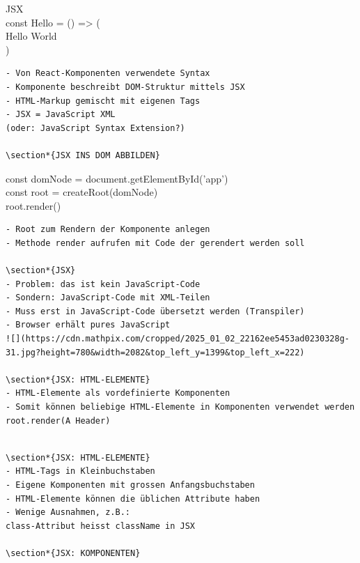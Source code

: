 JSX\\
const Hello = () => (\\
Hello World\\
)

\begin{verbatim}
- Von React-Komponenten verwendete Syntax
- Komponente beschreibt DOM-Struktur mittels JSX
- HTML-Markup gemischt mit eigenen Tags
- JSX = JavaScript XML
(oder: JavaScript Syntax Extension?)

\section*{JSX INS DOM ABBILDEN}
\end{verbatim}

const domNode = document.getElementById('app')\\
const root = createRoot(domNode)\\
root.render()

\begin{verbatim}
- Root zum Rendern der Komponente anlegen
- Methode render aufrufen mit Code der gerendert werden soll

\section*{JSX}
- Problem: das ist kein JavaScript-Code
- Sondern: JavaScript-Code mit XML-Teilen
- Muss erst in JavaScript-Code übersetzt werden (Transpiler)
- Browser erhält pures JavaScript
![](https://cdn.mathpix.com/cropped/2025_01_02_22162ee5453ad0230328g-31.jpg?height=780&width=2082&top_left_y=1399&top_left_x=222)

\section*{JSX: HTML-ELEMENTE}
- HTML-Elemente als vordefinierte Komponenten
- Somit können beliebige HTML-Elemente in Komponenten verwendet werden
root.render(A Header)
\end{verbatim}



\begin{verbatim}

\section*{JSX: HTML-ELEMENTE}
- HTML-Tags in Kleinbuchstaben
- Eigene Komponenten mit grossen Anfangsbuchstaben
- HTML-Elemente können die üblichen Attribute haben
- Wenige Ausnahmen, z.B.:
class-Attribut heisst className in JSX

\section*{JSX: KOMPONENTEN}
\end{verbatim}

